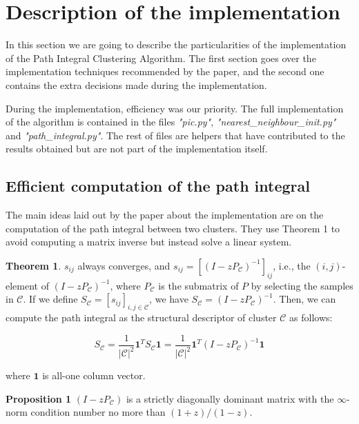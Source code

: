 \documentclass[
	10pt,
	parskip=half-,	
	paper=a4,
	english
	]{scrartcl}
\begin{document}
\section {Description of the implementation}

In this section we are going to describe the particularities of the implementation of the Path Integral Clustering Algorithm. The first section goes over the implementation techniques recommended by the paper, and the second one contains the extra decisions made during the implementation. 

During the implementation, efficiency was our priority. The full implementation of the algorithm is contained in the files \textit{"pic.py"}, \textit{"nearest\_neighbour\_init.py"} and \textit{"path\_integral.py"}. The rest of files are helpers that have contributed to the results obtained but are not part of the implementation itself.

\subsection{Efficient computation of the path integral}

The main ideas laid out by the paper about the implementation are on the computation of the path integral between two clusters. They use Theorem 1 to avoid computing a matrix inverse but instead solve a linear system. 

\textbf{Theorem 1}. $s_{ij}$ always converges, and $s_{ij}= \left[(I - zP_{\mathcal{C}})^{-1}\right]_{ij}$, i.e., the $(i,j)$-element of $(I-zP_{\mathcal{C}})^{-1}$, where $P_{\mathcal{C}}$ is the submatrix of $P$ by selecting the samples in $\mathcal{C}$. If we define $S_{\mathcal{C}} = [s_{ij}]_{i,j \in \mathcal{C}}$, we have $S_{\mathcal{C}} = (I - zP_{\mathcal{C}})^{-1}$. Then, we can compute the path integral as the structural descriptor of cluster $\mathcal{C}$ as follows:

\begin{equation}
    S_{\mathcal{C}} = \frac{1}{|\mathcal{C}|^2} \mathbf{1}^{T} S_{\mathcal{C}} \mathbf{1}
    = \frac{1}{|\mathcal{C}|^2} \mathbf{1}^{T} (I - zP_{\mathcal{C}})^{-1} \mathbf{1}
    \label{eq8}
\end{equation}

where $\mathbf{1}$ is all-one column vector.

\textbf{Proposition 1} $(I - zP_{\mathcal{C}})$ is a strictly diagonally dominant matrix with the $\infty$-norm condition number no more than $(1+z)/(1-z)$.
\end{document}
